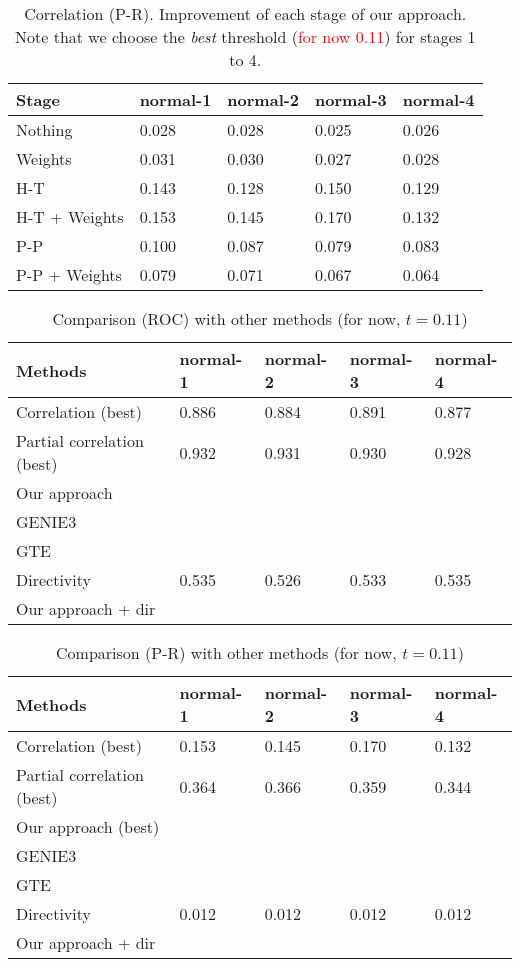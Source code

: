 \documentclass[wcp]{jmlr}
\begin{document}
\begin{table}[H]
\centering
\caption{Correlation (P-R). Improvement of each stage of our approach. Note that we choose the
         \textit{best} threshold (\textcolor{red}{for now 0.11}) for stages 1 to 4.}
\begin{tabular}{*{5}{l}}
\toprule
Stage               & normal-1 & normal-2 & normal-3 & normal-4 \\
\midrule
Nothing             & 0.028 & 0.028 & 0.025 & 0.026\\
Weights             & 0.031 & 0.030 & 0.027 & 0.028\\
H-T                 & 0.143 & 0.128 & 0.150 & 0.129\\
H-T + Weights       & 0.153 & 0.145 & 0.170 & 0.132\\
P-P                 & 0.100 & 0.087 & 0.079 & 0.083\\
P-P + Weights       & 0.079 & 0.071 & 0.067 & 0.064\\
\bottomrule
\end{tabular}
\end{table}


\begin{table}[H]
\centering
\caption{Comparison (ROC) with other methods (for now, $t = 0.11$)}
\begin{tabular}{*{5}{l}}
\toprule
Methods             & normal-1 & normal-2 & normal-3 & normal-4 \\
\midrule
Correlation (best)         & 0.886 & 0.884 & 0.891 & 0.877\\
Partial correlation (best) & 0.932 & 0.931 & 0.930 & 0.928 \\
Our approach               & & & & \\
GENIE3                     & & & & \\
GTE                        & & & & \\
Directivity                & 0.535 & 0.526 & 0.533 & 0.535 \\
Our approach + dir         & & & & \\
\bottomrule
\end{tabular}
\end{table}


\begin{table}[htb]
\centering
\caption{Comparison (P-R) with other methods (for now, $t = 0.11$)}
\begin{tabular}{*{5}{l}}
\toprule
Methods             & normal-1 & normal-2 & normal-3 & normal-4 \\
\midrule
Correlation (best)         & 0.153 & 0.145 & 0.170 & 0.132 \\
Partial correlation (best) & 0.364 & 0.366 & 0.359 & 0.344 \\
Our approach (best)        & & & & \\
GENIE3                     & & & & \\
GTE                        & & & & \\
Directivity                & 0.012 & 0.012 & 0.012 & 0.012\\
Our approach + dir         & & & & \\
\bottomrule
\end{tabular}
\end{table}
\end{document}
